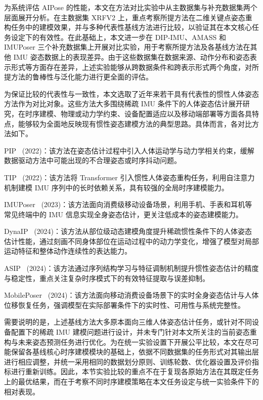 
为系统评估 AIPose 的性能，本文在方法对比实验中从主数据集与补充数据集两个层面展开分析。在主数据集 XRFV2 上，重点考察所提方法在二维关键点姿态重构任务中的建模效果，并与多种代表性基线方法进行比较，以验证其在本文核心任务设定下的有效性。在此基础上，本文进一步在 DIP-IMU、AMASS 和 IMUPoser 三个补充数据集上开展对比实验，用于考察所提方法及各基线方法在其他 IMU 姿态数据上的表现差异。由于这些数据集在数据来源、动作分布和姿态表示形式等方面存在差异，上述实验能够从跨数据条件和跨表示形式两个角度，对所提方法的鲁棒性与泛化能力进行更全面的评估。

为保证比较的代表性与一致性，本文选取了近年来若干具有代表性的惯性人体姿态方法作为对比对象。这些方法大多围绕稀疏 IMU 条件下的人体姿态估计展开研究，在时序建模、物理或动力学约束、设备配置适应以及移动端部署等方面各具特点，能够较为全面地反映现有惯性姿态建模方法的典型思路。具体而言，各对比方法如下。

PIP~\cite{yi2022physical} (2022)：该方法在姿态估计过程中引入人体运动学与动力学相关约束，缓解数据驱动方法中可能出现的不合理姿态或时序抖动问题。

TIP~\cite{jiang2022transformer} (2022)：该方法将 Transformer 引入惯性人体姿态重构任务，利用自注意力机制建模 IMU 序列中的长时依赖关系，具有较强的全局时序建模能力。

IMUPoser~\cite{mollyn2023imuposer} (2023)：该方法面向消费级移动设备场景，利用手机、手表和耳机等常见终端中的 IMU 信息实现全身姿态估计，更关注低成本的姿态建模能力。

DynaIP~\cite{zhang2024dynamic} (2024)：该方法从部位级动态建模角度提升稀疏惯性条件下的人体姿态估计性能，通过刻画不同身体部位在运动过程中的动力学变化，增强了模型对局部运动特征和整体动作连续性的表达能力。

ASIP~\cite{wu2024accurate} (2024)：该方法通过序列结构学习与特征调制机制提升惯性姿态估计的精度与稳定性，重点关注复杂时序模式下的有效特征提取与误差抑制。

MobilePoser~\cite{xu2024mobileposer} (2024)：该方法面向移动消费设备场景下的实时全身姿态估计与人体位移恢复任务，强调模型在实际部署条件下的实时性、可用性与系统完整性。

需要说明的是，上述基线方法大多原本面向三维人体姿态估计任务，或针对不同设备配置下的稀疏 IMU 建模问题进行设计，并未专门针对本文所关注的当前姿态重构与未来姿态预测任务进行优化。为在统一实验设置下开展公平比较，本文在尽可能保留各基线核心时序建模模块的基础上，依据不同数据集的任务形式对其输出层进行相应调整，并统一采用相同的数据划分原则、训练轮数、优化器设置及评价指标进行重新训练。因此，本节实验比较的重点不在于复现各原始方法在其既定任务上的最优结果，而在于考察不同时序建模策略在本文任务设定与统一实验条件下的相对表现。

